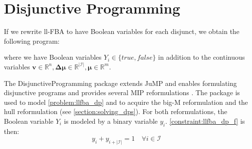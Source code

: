 \section{Disjunctive Programming} \label{section:disjunctive_programming}
If we rewrite \textsf{ll-FBA} to have Boolean variables for each disjunct, we obtain the following program:
 where we have Boolean variables $Y_i \in \{true, false \}$ in addition to the continuous variables $\mathbf v \in \mathbb{R}^n, \boldsymbol{\Delta \mu} \in \mathbb{R}^{|\mathcal{I}|}, \boldsymbol \mu \in \mathbb{R}^m$. %

The \textsf{DisjunctiveProgramming} package extends \textsf{JuMP} and enables formulating disjunctive programs and provides several MIP reformulations \cite{perez_disjunctiveprogrammingjl_2023}. The package is used to model \cref{problem:llfba_dp} and to acquire the big-M reformulation and the hull reformulation (see \cref{section:solving_dps}). For both reformulations, the Boolean variable $Y_i$ is modeled by a binary variable $y_i$. \cref{constraint:llfba_dp_f} is then:
\begin{equation*}
    y_i + y_{i + |\mathcal{I}|} = 1 \quad \forall i \in \mathcal{I}
\end{equation*}

